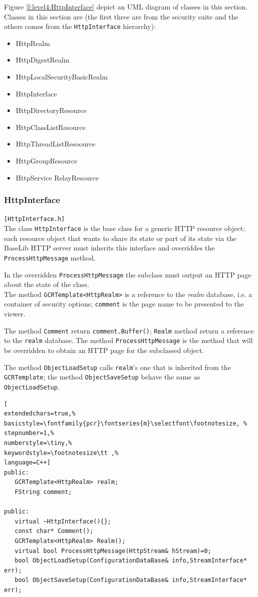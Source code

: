 Figure \ref{f:level4:HttpInterface} depict an UML diagram of classes in this section. Classes in this section are (the first three are from the security suite and the others comes from the \texttt{HttpInterface} hierarchy):
\begin{itemize}
 \item HttpRealm
 \item HttpDigestRealm
 \item HttpLocalSecurityBasicRealm

 \item HttpInterface
 \item HttpDirectoryResource
 \item HttpClassListResource
 \item HttpThreadListResoource
 \item HttpGroupResource
 \item HttpService RelayResource
\end{itemize}



\subsubsection{HttpInterface}
\texttt{[HttpInterface.h]}\\
The class \texttt{HttpInterface} is the base class for a generic HTTP resource object; each resource object that wants to share its state or part of its state via the BaseLib HTTP server must inherits this interface and overriddes the \texttt{ProcessHttpMessage} method.

In the overridden \texttt{ProcessHttpMessage} the subclass must output an HTTP page about the state of the class.\\


The method \texttt{GCRTemplate<HttpRealm>} is a reference to the \textit{realm} database, i.e. a container of security options; \texttt{comment} is the page name to be presented to the viewer.


The method \texttt{Comment} return \texttt{comment.Buffer()}; \texttt{Realm} method return a reference to the \texttt{realm} database. The method \texttt{ProcessHttpMessage} is the method that will be overridden to obtain an HTTP page for the subclassed object.

The method \texttt{ObjectLoadSetup} calls \texttt{realm}'s one that is inherited from the \texttt{GCRTemplate}; the method \texttt{ObjectSaveSetup} behave the same as \texttt{ObjectLoadSetup}.

\begin{lstlisting}[
extendedchars=true,%
basicstyle=\fontfamily{pcr}\fontseries{m}\selectfont\footnotesize, %
stepnumber=1,%
numberstyle=\tiny,%
keywordstyle=\footnotesize\tt ,%
language=C++]
public:
   GCRTemplate<HttpRealm> realm;
   FString comment;

public:
   virtual ~HttpInterface(){};
   const char* Comment();
   GCRTemplate<HttpRealm> Realm();
   virtual bool ProcessHttpMessage(HttpStream& hStream)=0;
   bool ObjectLoadSetup(ConfigurationDataBase& info,StreamInterface* err);
   bool ObjectSaveSetup(ConfigurationDataBase& info,StreamInterface* err);
\end{lstlisting}



